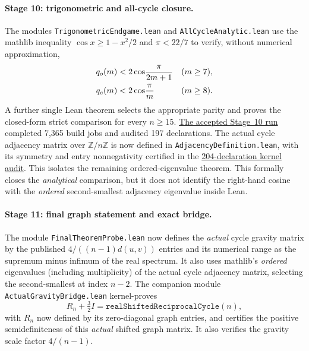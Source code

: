 \paragraph{Stage 10: trigonometric and all-cycle closure.}
The modules \texttt{TrigonometricEndgame.lean} and
\texttt{AllCycleAnalytic.lean} use the mathlib inequality
$\cos x\ge1-x^2/2$ and $\pi<22/7$ to verify, without numerical
approximation,
\begin{align}\label{eq:lean-cos-comparison}
q_o(m)&<2\cos\!\frac{\pi}{2m+1} &&(m\ge7),\notag\\
q_e(m)&<2\cos\!\frac{\pi}{m} &&(m\ge8).
\end{align}
A further single Lean theorem selects the appropriate parity
and proves the closed-form strict comparison for every $n\ge15$.
\href{https://github.com/tonynewton79-web/newton-400-conjectures/actions/runs/39146022640}{The accepted Stage~10 run}
completed 7,365 build jobs and audited 197 declarations.
The actual cycle adjacency matrix over $\mathbb Z/n\mathbb Z$
is now defined in \texttt{AdjacencyDefinition.lean}, with its
symmetry and entry nonnegativity certified in the
\href{https://github.com/tonynewton79-web/newton-400-conjectures/actions/runs/39146480928}{204-declaration kernel audit}.
This isolates the remaining ordered-eigenvalue theorem.
This formally closes the \emph{analytical} comparison, but it
does not identify the right-hand cosine with the \emph{ordered}
second-smallest adjacency eigenvalue inside Lean.


\paragraph{Stage 11: final graph statement and exact bridge.}
The module \texttt{FinalTheoremProbe.lean} now defines the
\emph{actual} cycle gravity matrix by the published
$4/((n-1)d(u,v))$ entries and its numerical range as the
supremum minus infimum of the real spectrum. It also uses
mathlib's \emph{ordered} eigenvalues (including multiplicity)
of the actual cycle adjacency matrix, selecting the
second-smallest at index $n-2$. The companion module
\texttt{ActualGravityBridge.lean} kernel-proves
\begin{equation}\label{eq:actual-shift}
R_n+\tfrac32 I=\texttt{realShiftedReciprocalCycle}(n),
\end{equation}
with $R_n$ now defined by its zero-diagonal graph entries,
and certifies the positive semidefiniteness of this
\emph{actual} shifted graph matrix. It also verifies the
gravity scale factor $4/(n-1)$.

